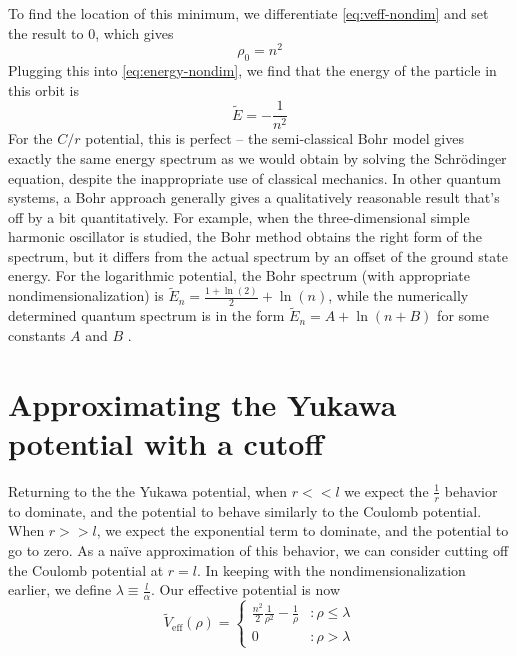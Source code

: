 \documentclass[12pt,twoside]{reedthesis}
\newcommand{\eqn}[1]{\begin{equation}#1\end{equation}}
\begin{document}
To find the location of this minimum, we differentiate \eqref{eq:veff-nondim} and set the result to $0$, which gives
\eqn{
\rho_0 = n^2
\label{eq:rho-n}
}
Plugging this into \eqref{eq:energy-nondim}, we find that the energy of the particle in this orbit is
\eqn{
\tilde{E} = -\frac{1}{n^2}
}
For the $C/r$ potential, this is perfect -- the semi-classical Bohr model gives exactly the same energy spectrum as we would obtain by solving the Schr\"odinger equation, despite the inappropriate use of classical mechanics. In other quantum systems, a Bohr approach generally gives a qualitatively reasonable result that's off by a bit quantitatively. For example, when the three-dimensional simple harmonic oscillator is studied, the Bohr method obtains the right form of the spectrum, but it differs from the actual spectrum by an offset of the ground state energy. For the logarithmic potential, the Bohr spectrum (with appropriate nondimensionalization) is $\tilde{E}_n = \frac{1 + \ln(2)}{2}+\ln(n)$, while the numerically determined quantum spectrum is in the form $\tilde{E}_n = A + \ln(n+B)$ for some constants $A$ and $B$ \cite{Garon}.

\section{Approximating the Yukawa potential with a cutoff}

Returning to the the Yukawa potential, when $r << l$ we expect the $\frac{1}{r}$ behavior to dominate, and the potential to behave similarly to the Coulomb potential. When $r >> l$, we expect the exponential term to dominate, and the potential to go to zero. As a na\"ive approximation of this behavior, we can consider cutting off the Coulomb potential at $r = l$. In keeping with the nondimensionalization earlier, we define $\lambda \equiv \frac{l}{\alpha}$. Our effective potential is now
\eqn{
\tilde{V}_{\mathrm{eff}}(\rho) = \left\{
\begin{array}{lr}
 \frac{n^2}{2}\frac{1}{\rho^2}-\frac{1}{\rho} & : \rho \leq \lambda \\
0 & : \rho > \lambda
\end{array}
\right.
\label{eq:naive}
}
\end{document}
